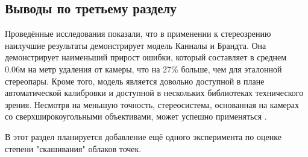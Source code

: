 \subsection{Выводы по третьему разделу}

Проведённые исследования показали, что в применении к стереозрению наилучшие результаты демонстрирует модель Канналы и Брандта. Она демонстрирует наименьший 
прирост ошибки, который составляет в среднем 0.06м на метр удаления от камеры, что на 27\% больше, чем для эталонной стереопары. Кроме того, модель является довольно доступной 
в плане автоматической калибровки и доступной в нескольких библиотеках технического зрения. Несмотря на меньшую точность, 
стереосистема, основанная на камерах со сверхширокоугольными объективами, может успешно применяться \cite{}.

В этот раздел планируется добавление ещё одного эксперимента по оценке степени "скашивания" облаков точек. 